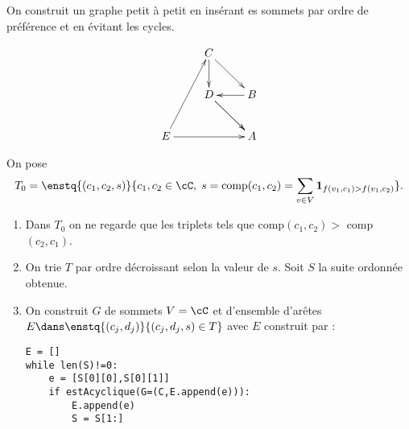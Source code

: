 \documentclass{mybourbaki}
\begin{document}
On construit un graphe petit à petit en insérant es sommets par ordre de préférence et en évitant les cycles.

\[\xymatrix{ 
&  C \ar[rd]\ar[d] \\
& D\ar[rd] \ar[rd] & B\ar[l]\\
E \ar[uur] \ar[rr]&& A
}\]

On pose \[T_0 = \enstq{(c_1,c_2,s)}{c_1,c_2\in\cC, \; s = \text{comp}(c_1,c_2) = \sum_{v\in V}\mathbf{1}_{f(v_1,c_1)>f(v_1,c_2)}}. \]
\begin{enumerate}
\item Dans $T_0$ on ne regarde que les triplets tels que comp$(c_1,c_2) >$ comp$(c_2,c_1)$.
\item On trie $T$ par ordre décroissant selon la valeur de $s$. Soit $S$ la suite ordonnée obtenue.
\item On construit $G$ de sommets $V = \cC$ et d'ensemble d'arêtes $E\dans\enstq{(c_j,d_j)}{(c_j,d_j,s)\in T}$ avec $E$ construit par :
\begin{lstlisting}
E = []
while len(S)!=0:
	e = [S[0][0],S[0][1]]
	if estAcyclique(G=(C,E.append(e))):
		E.append(e)
		S = S[1:]
\end{lstlisting}
\end{enumerate}


\end{document}
